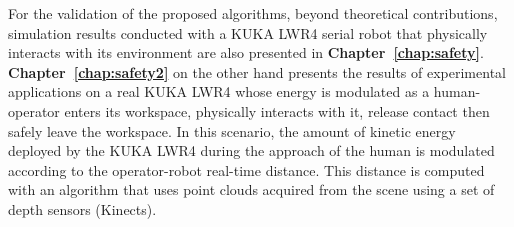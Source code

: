 For the validation of the proposed algorithms, beyond theoretical contributions, simulation results conducted with a KUKA LWR4 serial robot that physically interacts with its environment are also presented in \textbf{Chapter~\ref{chap:safety}}. \textbf{Chapter~\ref{chap:safety2}} on the other hand presents the results of experimental applications on a real KUKA LWR4 whose energy is modulated as a human-operator enters its workspace, physically interacts with it, release contact then safely leave the workspace. In this scenario, the amount of kinetic energy deployed by the KUKA LWR4 during the approach of the human is modulated according to the operator-robot real-time distance. This distance is computed with an algorithm that uses point clouds acquired from the scene using a set of depth sensors (Kinects).






